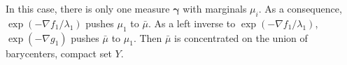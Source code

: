 In this case, there is only one measure $\boldsymbol{\gamma}$ with marginals $\mu_i$.
As a consequence, $\exp(-\nabla f_1 / \lambda_1)$ pushes $\mu_1$ to $\bar{\mu}$.
As a left inverse to $\exp(-\nabla f_1/\lambda_1)$,
\(\exp(-\nabla g_1)\) pushes $\bar{\mu}$ to $\mu_1$.
Then $\bar{\mu}$ is concentrated on the union of barycenters, compact set $Y$.
